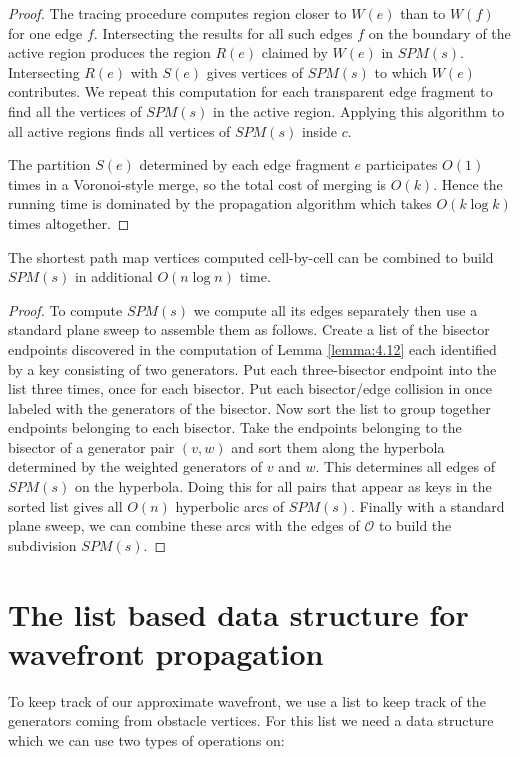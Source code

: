 \begin{proof}
    The tracing procedure computes region closer to
	$W(e)$ than to $W(f)$ for one edge $f$. Intersecting the results for all
	such edges $f$ on the boundary of the active region produces the region
	$R(e)$ claimed by $W(e)$ in $SPM(s)$. Intersecting $R(e)$ with $S(e)$ gives
	vertices of $SPM(s)$ to which $W(e)$ contributes. We repeat this computation
	for each transparent edge fragment to find all the vertices of $SPM(s)$ in
	the active region. Applying this algorithm to all active regions finds all
	vertices of $SPM(s)$ inside $c$.

	The partition $S(e)$ determined by each edge fragment $e$ participates $O(1)$
	times in a Voronoi-style merge, so the total cost of merging is $O(k)$.
	Hence the running time is dominated by the propagation algorithm which takes
	$O(k\log k)$ times altogether.
\end{proof}
\begin{Lemma} \label{lemma:4.13} 
	The shortest path map vertices computed cell-by-cell can be combined to
	build $SPM(s)$ in additional $O(n\log n)$	 time.
\end{Lemma}
\begin{proof}
	To compute $SPM(s)$ we compute all its edges separately then use a standard
	plane sweep to assemble them as follows. Create a list of the bisector
	endpoints discovered in the computation of Lemma \ref{lemma:4.12} each identified by a
	key consisting of two generators. Put each three-bisector endpoint into the
	list three times, once for each bisector. Put each bisector/edge collision
	in once labeled with the generators of the bisector. Now sort the list to
	group together endpoints belonging to each bisector. Take the endpoints
	belonging to the bisector of a generator pair $(v,w)$ and sort them along
	the hyperbola determined by the weighted generators of $v$ and $w$. This
	determines all edges of $SPM(s)$ on the hyperbola. Doing this for all pairs
	that appear as keys in the sorted list gives all $O(n)$ hyperbolic arcs of
	$SPM(s)$. Finally with a standard plane sweep, we can combine these arcs
	with the edges of $\mathcal{O}$ to build the subdivision $SPM(s)$.
\end{proof}

\section{The list based data structure for wavefront propagation}

To keep track of our approximate wavefront, we use a list to keep track of the generators coming from 
obstacle vertices. For this list we need a data structure which we can use two types of operations on:

